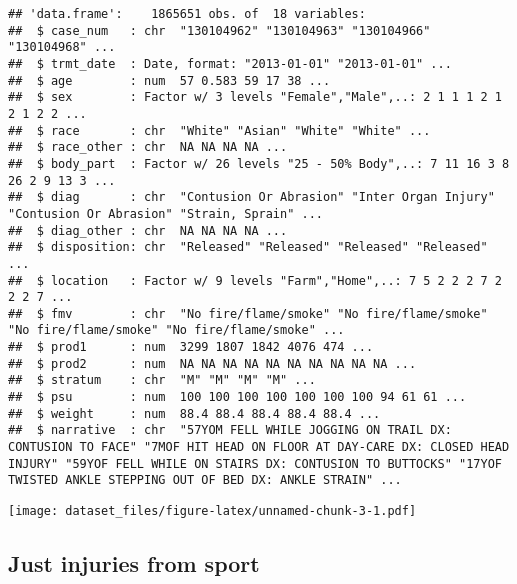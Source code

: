 \documentclass[]{article}
\newenvironment{Shaded}{\begin{snugshade}}{\end{snugshade}}
\newcommand{\DataTypeTok}[1]{\textcolor[rgb]{0.13,0.29,0.53}{#1}}
\newcommand{\KeywordTok}[1]{\textcolor[rgb]{0.13,0.29,0.53}{\textbf{#1}}}
\newcommand{\NormalTok}[1]{#1}
\newcommand{\OperatorTok}[1]{\textcolor[rgb]{0.81,0.36,0.00}{\textbf{#1}}}
\newcommand{\StringTok}[1]{\textcolor[rgb]{0.31,0.60,0.02}{#1}}
\begin{document}
\begin{verbatim}
## 'data.frame':    1865651 obs. of  18 variables:
##  $ case_num   : chr  "130104962" "130104963" "130104966" "130104968" ...
##  $ trmt_date  : Date, format: "2013-01-01" "2013-01-01" ...
##  $ age        : num  57 0.583 59 17 38 ...
##  $ sex        : Factor w/ 3 levels "Female","Male",..: 2 1 1 1 2 1 2 1 2 2 ...
##  $ race       : chr  "White" "Asian" "White" "White" ...
##  $ race_other : chr  NA NA NA NA ...
##  $ body_part  : Factor w/ 26 levels "25 - 50% Body",..: 7 11 16 3 8 26 2 9 13 3 ...
##  $ diag       : chr  "Contusion Or Abrasion" "Inter Organ Injury" "Contusion Or Abrasion" "Strain, Sprain" ...
##  $ diag_other : chr  NA NA NA NA ...
##  $ disposition: chr  "Released" "Released" "Released" "Released" ...
##  $ location   : Factor w/ 9 levels "Farm","Home",..: 7 5 2 2 2 7 2 2 2 7 ...
##  $ fmv        : chr  "No fire/flame/smoke" "No fire/flame/smoke" "No fire/flame/smoke" "No fire/flame/smoke" ...
##  $ prod1      : num  3299 1807 1842 4076 474 ...
##  $ prod2      : num  NA NA NA NA NA NA NA NA NA NA ...
##  $ stratum    : chr  "M" "M" "M" "M" ...
##  $ psu        : num  100 100 100 100 100 100 100 94 61 61 ...
##  $ weight     : num  88.4 88.4 88.4 88.4 88.4 ...
##  $ narrative  : chr  "57YOM FELL WHILE JOGGING ON TRAIL DX: CONTUSION TO FACE" "7MOF HIT HEAD ON FLOOR AT DAY-CARE DX: CLOSED HEAD INJURY" "59YOF FELL WHILE ON STAIRS DX: CONTUSION TO BUTTOCKS" "17YOF TWISTED ANKLE STEPPING OUT OF BED DX: ANKLE STRAIN" ...
\end{verbatim}

\begin{Shaded}
\end{Shaded}

\texttt{[image: dataset\_files/figure-latex/unnamed-chunk-3-1.pdf]}

\hypertarget{just-injuries-from-sport}{%
\subsection{Just injuries from sport}\label{just-injuries-from-sport}}

\begin{Shaded}
\end{Shaded}
\end{document}
